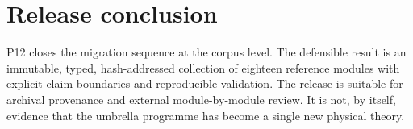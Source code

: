 \documentclass[11pt,a4paper]{article}
\theoremstyle{definition}
\theoremstyle{plain}
\theoremstyle{remark}
\begin{document}
\section{Release conclusion}

P12 closes the migration sequence at the corpus level.  The defensible
result is an immutable, typed, hash-addressed collection of eighteen
reference modules with explicit claim boundaries and reproducible
validation.  The release is suitable for archival provenance and
external module-by-module review.  It is not, by itself, evidence that
the umbrella programme has become a single new physical theory.
\end{document}
